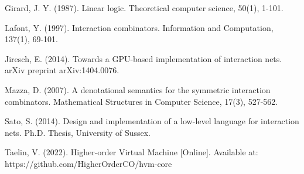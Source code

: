 \documentclass{article}
\begin{document}
\begin{thebibliography}{9}
Girard, J. Y. (1987). Linear logic. Theoretical computer science, 50(1), 1-101.

Lafont, Y. (1997). Interaction combinators. Information and Computation, 137(1), 69-101.

Jiresch, E. (2014). Towards a GPU-based implementation of interaction nets. arXiv preprint arXiv:1404.0076.

Mazza, D. (2007). A denotational semantics for the symmetric interaction combinators. Mathematical Structures in Computer Science, 17(3), 527-562.

Sato, S. (2014). Design and implementation of a low-level language for interaction nets. Ph.D. Thesis, University of Sussex.

Taelin, V. (2022). Higher-order Virtual Machine [Online]. Available at: https://github.com/HigherOrderCO/hvm-core
\end{thebibliography}
\end{document}
